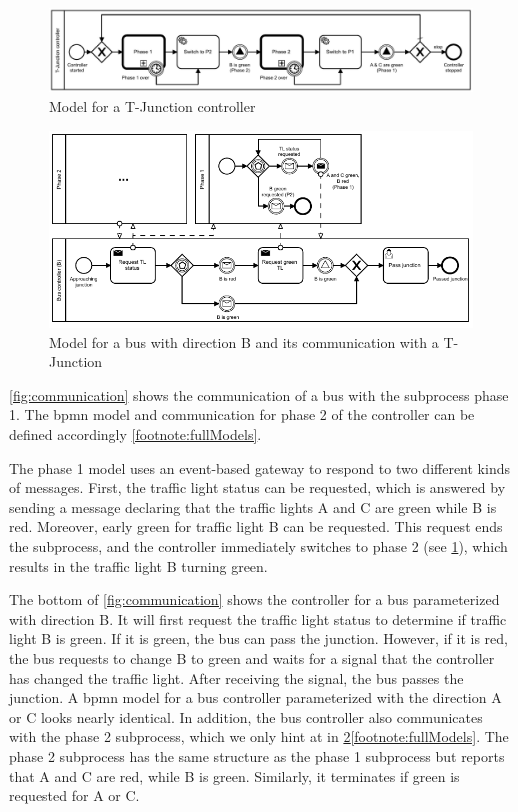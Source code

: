 \documentclass{jot}
\begin{document}
\begin{figure}[h]
    \centering
    \includegraphics[width=1\textwidth]{figures/t-junction.pdf}
    \caption{Model for a T-Junction controller}
    \label{fig:t_junction}
\end{figure}

\begin{figure}[ht]
    \centering
    \includegraphics[width=1\textwidth]{figures/communication.pdf}
    \caption{Model for a bus with direction B and its communication with a T-Junction}
    \label{fig:communication}
\end{figure}

\autoref{fig:communication} shows the communication of a bus with the subprocess phase 1.
The \gls*{bpmn} model and communication for phase 2 of the controller can be defined accordingly \cref{footnote:fullModels}.

The phase 1 model uses an event-based gateway to respond to two different kinds of messages.
First, the traffic light status can be requested, which is answered by sending a message declaring that the traffic lights A and C are green while B is red.
Moreover, early green for traffic light B can be requested.
This request ends the subprocess, and the controller immediately switches to phase 2 (see \cref{fig:t_junction}), which results in the traffic light B turning green.

The bottom of \autoref{fig:communication} shows the controller for a bus parameterized with direction B.
It will first request the traffic light status to determine if traffic light B is green.
If it is green, the bus can pass the junction.
However, if it is red, the bus requests to change B to green and waits for a signal that the controller has changed the traffic light.
After receiving the signal, the bus passes the junction.
A \gls*{bpmn} model for a bus controller parameterized with the direction A or C looks nearly identical.
In addition, the bus controller also communicates with the phase 2 subprocess, which we only hint at in \cref{fig:communication}\cref{footnote:fullModels}.
The phase 2 subprocess has the same structure as the phase 1 subprocess but reports that A and C are red, while B is green.
Similarly, it terminates if green is requested for A or C.
\end{document}
